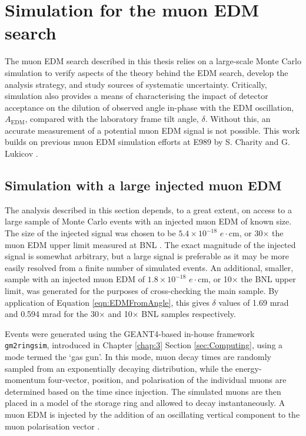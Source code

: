 
\chapter[Simulation for the muon EDM search]{Simulation for the muon EDM \\search}\label{chap:5}



The muon EDM search described in this thesis relies on a large-scale Monte Carlo simulation to verify aspects of the theory behind the EDM search, develop the analysis strategy, and study sources of systematic uncertainty. Critically, simulation also provides a means of characterising the impact of detector acceptance on the dilution of observed angle in-phase with the EDM oscillation, $A_{\text{EDM}}$, compared with the laboratory frame tilt angle, $\delta$. Without this, an accurate measurement of a potential muon EDM signal is not possible. This work builds on previous muon EDM simulation efforts at E989 by S. Charity \cite{Charity} and G. Lukicov \cite{Lukicov}.

\section{Simulation with a large injected muon EDM}\label{sec:SimulatingALargeEDM}

The analysis described in this section depends, to a great extent, on access to a large sample of Monte Carlo events with an injected muon EDM of known size. The size of the injected signal was chosen to be $5.4\times10^{-18}$ $e\cdot\text{cm}$, or 30$\times$ the muon EDM upper limit measured at BNL \cite{BNLEDM}. The exact magnitude of the injected signal is somewhat arbitrary, but a large signal is preferable as it may be more easily resolved from a finite number of simulated events. An additional, smaller, sample with an injected muon EDM of $1.8\times10^{-18}$ $e\cdot\text{cm}$, or 10$\times$ the BNL upper limit, was generated for the purposes of cross-checking the main sample. By application of Equation \ref{eqn:EDMFromAngle}, this gives $\delta$ values of 1.69 mrad and 0.594 mrad for the 30$\times$ and 10$\times$ BNL samples respectively. 

Events were generated using the GEANT4-based in-house framework \texttt{gm2ringsim}, introduced in Chapter \ref{chap:3} Section \ref{sec:Computing}, using a mode termed the `gas gun'. In this mode, muon decay times are randomly sampled from an exponentially decaying distribution, while the energy-momentum four-vector, position, and polarisation of the individual muons are determined based on the time since injection. The simulated muons are then placed in a model of the storage ring and allowed to decay instantaneously. A muon EDM is injected by the addition of an oscillating vertical component to the muon polarisation vector \cite{Charity}. 

